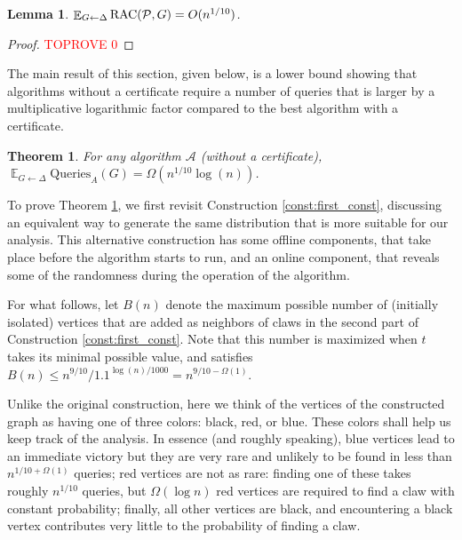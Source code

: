 \documentclass[11pt]{article}
\numberwithin{equation}{section}
\newtheorem{theorem}{Theorem}[section]
\newtheorem{lemma}[lemma]{Lemma}
\newcommand\E{\mathop{\mathbb E}}
\newcommand{\Query}{\text{Queries}}
\renewcommand{\P}{\mathcal{P}}
\newcommand{\1}{\mathbf{1}}
\newcommand{\A}{\mathcal A}
\begin{document}
\begin{lemma}
$\E_{G \leftarrow \Delta} \RACC(\P, G) = O(n^{1/10})$.
\end{lemma}


\begin{proof}\textcolor{red}{TOPROVE 0}\end{proof}






The main result of this section, given below, is a lower bound showing that algorithms without a certificate require a number of queries that is larger by a multiplicative logarithmic factor compared to the best algorithm with a certificate.

\begin{theorem}
\label{thm:lower_bound_claw_no_cert}
For any algorithm $\A$ (without a certificate), $ \E_{G \leftarrow \Delta}\Query_A(G) = \Omega(n^{1/10} \log(n))$. \end{theorem}

To prove Theorem \ref{thm:lower_bound_claw_no_cert}, we first revisit Construction \ref{const:first_const}, discussing an equivalent way to generate the same distribution that is more suitable for our analysis. This alternative construction has some offline components, that take place before the algorithm starts to run, and an online component, that reveals some of the randomness during the operation of the algorithm.

For what follows, let $B(n)$ denote the maximum possible number of (initially isolated) vertices that are added as neighbors of claws in the second part of Construction \ref{const:first_const}. Note that this number is maximized when $t$ takes its minimal possible value, and satisfies $B(n) \leq n^{9/10} / 1.1^{\log (n) / 1000} = n^{9/10 - \Omega(1)}$.

Unlike the original construction, here we think of the vertices of the constructed graph as having one of three colors: black, red, or blue. These colors shall help us keep track of the analysis. In essence (and roughly speaking), blue vertices lead to an immediate victory but they are very rare and unlikely to be found in less than $n^{1/10 + \Omega(1)}$ queries; red vertices are not as rare: finding one of these takes roughly $n^{1/10}$ queries, but $\Omega(\log n)$ red vertices are required to find a claw with constant probability; finally, all other vertices are black, and encountering a black vertex contributes very little to the probability of finding a claw.
\end{document}
